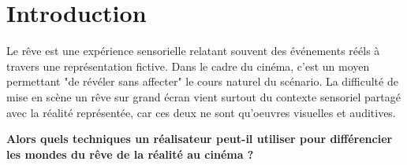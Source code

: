 \documentclass[../main.tex]{subfile}
\begin{document}
\section{Introduction}

Le rêve est une expérience sensorielle relatant souvent des événements rééls à
travers une représentation fictive. Dans le cadre du cinéma, c'est un moyen
permettant "de révéler sans affecter" le cours naturel du scénario. La
difficulté de mise en scène un rêve sur grand écran vient surtout du contexte
sensoriel partagé avec la réalité représentée, car ces deux ne sont qu'oeuvres
visuelles et auditives.

\textbf{Alors quels techniques un réalisateur peut-il utiliser pour
    différencier les mondes du rêve de la réalité au cinéma ?}
\end{document}
